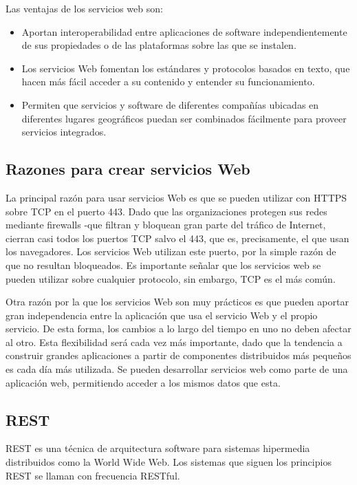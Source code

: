 Las ventajas de los servicios web son:

\begin{itemize}
    \item Aportan interoperabilidad entre aplicaciones de software independientemente de sus propiedades o de las plataformas sobre las que se instalen.
    \item Los servicios Web fomentan los estándares y protocolos basados en texto, que hacen más fácil acceder a su contenido y entender su funcionamiento.
    \item Permiten que servicios y software de diferentes compañías ubicadas en diferentes lugares geográficos puedan ser combinados fácilmente para proveer servicios integrados.
   
 \end{itemize}
 
\subsection{Razones para crear servicios Web}

La principal razón para usar servicios Web es que se pueden utilizar con HTTPS sobre \gls{TCP} en el puerto 443. Dado que las organizaciones protegen sus redes mediante firewalls -que filtran y bloquean gran parte del tráfico de Internet, cierran casi todos los puertos TCP salvo el 443, que es, precisamente, el que usan los navegadores. Los servicios Web utilizan este puerto, por la simple razón de que no resultan bloqueados. Es importante señalar que los servicios web se pueden utilizar sobre cualquier protocolo, sin embargo, TCP es el más común.

Otra razón por la que los servicios Web son muy prácticos es que pueden aportar gran independencia entre la aplicación que usa el servicio Web y el propio servicio. De esta forma, los cambios a lo largo del tiempo en uno no deben afectar al otro. Esta flexibilidad será cada vez más importante, dado que la tendencia a construir grandes aplicaciones a partir de componentes distribuidos más pequeños es cada día más utilizada.
Se pueden desarrollar servicios web como parte de una aplicación web, permitiendo acceder a los mismos datos que esta.


\subsection{REST}

REST es una técnica de arquitectura software para sistemas hipermedia distribuidos como la World Wide Web.
Los sistemas que siguen los principios REST se llaman con frecuencia RESTful.

